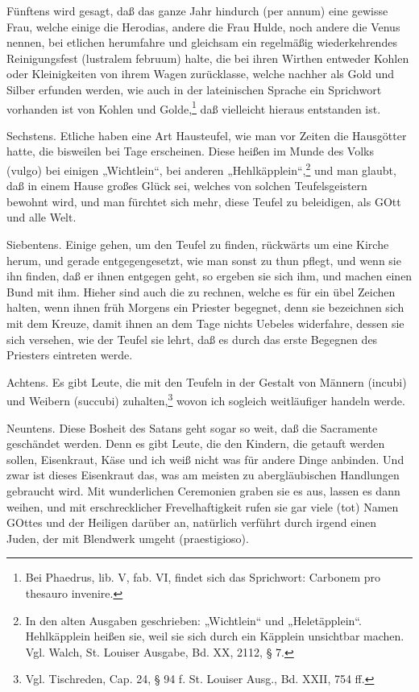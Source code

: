 Fünftens wird gesagt, daß das ganze Jahr hindurch (per annum) eine gewisse Frau, welche einige die Herodias, andere die Frau Hulde, noch andere die Venus nennen, bei etlichen herumfahre und gleichsam ein regelmäßig wiederkehrendes Reinigungsfest (lustralem februum) halte, die bei ihren Wirthen entweder Kohlen oder Kleinigkeiten von ihrem Wagen zurücklasse, welche nachher als Gold und Silber erfunden werden, wie auch in der lateinischen Sprache ein Sprichwort vorhanden ist von Kohlen und Golde,\footnote{Bei Phaedrus, lib. V, fab. VI, findet sich das Sprichwort: Carbonem pro thesauro invenire.} daß vielleicht hieraus entstanden ist.

Sechstens. Etliche haben eine Art Hausteufel, wie man vor Zeiten die Hausgötter hatte, die bisweilen bei Tage erscheinen. Diese heißen im Munde des Volks (vulgo) bei einigen „Wichtlein“, bei anderen „Hehlkäpplein“,\footnote{In den alten Ausgaben geschrieben: „Wichtlein“ und „Heletäpplein“. Hehlkäpplein heißen sie, weil sie sich durch ein Käpplein unsichtbar machen. Vgl. Walch, St. Louiser Ausgabe, Bd. XX, 2112, § 7.} und man glaubt, daß in einem Hause großes Glück sei, welches von solchen Teufelsgeistern bewohnt wird, und man fürchtet sich mehr, diese Teufel zu beleidigen, als GOtt und alle Welt.

Siebentens. Einige gehen, um den Teufel zu finden, rückwärts um eine Kirche herum, und gerade entgegengesetzt, wie man sonst zu thun pflegt, und wenn sie ihn finden, daß er ihnen entgegen geht, so ergeben sie sich ihm, und machen einen Bund mit ihm. Hieher sind auch die zu rechnen, welche es für ein übel Zeichen halten, wenn ihnen früh Morgens ein Priester begegnet, denn sie bezeichnen sich mit dem Kreuze, damit ihnen an dem Tage nichts Uebeles widerfahre, dessen sie sich versehen, wie der Teufel sie lehrt, daß es durch das erste Begegnen des Priesters eintreten werde.

Achtens. Es gibt Leute, die mit den Teufeln in der Gestalt von Männern (incubi) und Weibern (succubi) zuhalten,\footnote{Vgl. Tischreden, Cap. 24, § 94 f. St. Louiser Ausg., Bd. XXII, 754 ff.} wovon ich sogleich weitläufiger handeln werde.

Neuntens. Diese Bosheit des Satans geht sogar so weit, daß die Sacramente geschändet werden. Denn es gibt Leute, die den Kindern, die getauft werden sollen, Eisenkraut, Käse und ich weiß nicht was für andere Dinge anbinden. Und zwar ist dieses Eisenkraut das, was am meisten zu abergläubischen Handlungen gebraucht wird. Mit wunderlichen Ceremonien graben sie es aus, lassen es dann weihen, und mit erschrecklicher Frevelhaftigkeit rufen sie gar viele (tot) Namen GOttes und der Heiligen darüber an, natürlich verführt durch irgend einen Juden, der mit Blendwerk umgeht (praestigioso).

